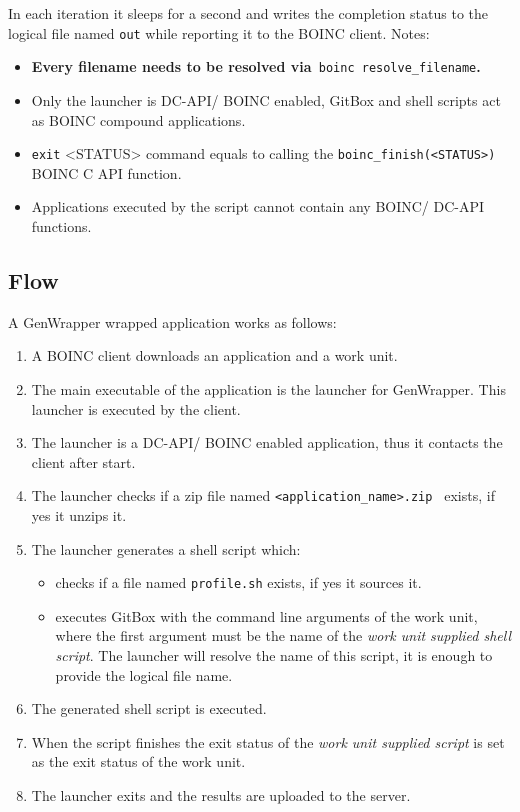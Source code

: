 \documentclass[a4paper,12pt,titlepage,dvipdfm]{article}
\begin{document}
In each iteration it sleeps for a second and writes the completion status to the logical file named \texttt{out} while reporting it to the BOINC client. Notes:
\begin{itemize}
    \item \textbf{Every filename needs to be resolved via}\texttt{ boinc resolve\_filename}\textbf{.}
    \item Only the launcher is DC-API/ BOINC enabled, GitBox and shell scripts act as BOINC compound applications.
    \item \texttt{exit} <STATUS> command equals to calling the \texttt{boinc\_finish(<STATUS>)} BOINC C API function.
    \item Applications executed by the script cannot contain any BOINC/ DC-API functions.
\end{itemize}

\subsection{Flow}

A GenWrapper wrapped application works as follows:
\begin{enumerate}
    \item A BOINC client downloads an application and a work unit.
    \item The main executable of the application is the launcher for GenWrapper. This launcher is executed by the client.
    \item The launcher is a DC-API/ BOINC enabled application, thus it contacts the client after start.
    \item The launcher checks if a zip file named \texttt{<application\_name>.zip } exists, if yes it unzips it.
    \item The launcher generates a shell script which:
        \begin{itemize}
            \item checks if a file named \texttt{profile.sh} exists, if yes it sources it.
            \item executes GitBox with the command line arguments of the work unit, where the first argument must be the name of the \emph{work unit supplied shell script}. The launcher will resolve the name of this script, it is enough to provide the logical file name.
        \end{itemize}
    
    \item The generated shell script is executed.
    \item When the script finishes the exit status of the \emph{work unit supplied script} is set as the exit status of the work unit.
    \item The launcher exits and the results are uploaded to the server.
\end{enumerate}
\end{document}
